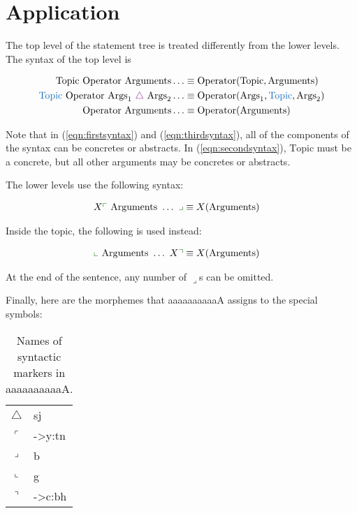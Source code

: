 \documentclass{book}
\newcommand{\lname}{aaaaaaaaaaA}
\begin{document}
\section{Application}

The top level of the statement tree is treated differently from the lower levels. The syntax of the top level is

\begin{align}
  \text{Topic } \text{Operator } \text{Arguments} \ldots &\equiv \text{Operator}(\text{Topic}, \text{Arguments})
  \label{eqn:firstsyntax} \\
  \hliii{\text{Topic }} \text{Operator } \text{Args}_1 \ \hli{\triangle}\  \text{Args}_2 \ldots
    &\equiv \text{Operator}(\text{Args}_1, \hliii{\text{Topic}}, \text{Args}_2)
  \label{eqn:secondsyntax} \\
  \text{Operator } \text{Arguments} \ldots &\equiv \text{Operator}(\text{Arguments})
  \label{eqn:thirdsyntax}
\end{align}

Note that in (\ref{eqn:firstsyntax}) and (\ref{eqn:thirdsyntax}), all of the components of the syntax can be concretes or abstracts. In (\ref{eqn:secondsyntax}), $\text{Topic}$ must be a concrete, but all other arguments may be concretes or abstracts.

The lower levels use the following syntax:

\begin{align}
  X\hlii{\ulcorner}\  \text{Arguments } \ldots\  \hlii{\lrcorner} &\equiv X(\text{Arguments})
\end{align}

Inside the topic, the following is used instead:

\begin{align}
  \hlii{\llcorner}\  \text{Arguments } \ldots\  X\hlii{\urcorner} &\equiv X(\text{Arguments})
\end{align}

At the end of the sentence, any number of $\lrcorner$s can be omitted.

Finally, here are the morphemes that \lname{} assigns to the special symbols:

\begin{table}[h]
  \caption{Names of syntactic markers in \lname.}
  \centering
  \begin{tabular}{l>{\kardinal}l}
    $\triangle$ & sj \\
    $\ulcorner$ & ->y:tn \\
    $\lrcorner$ & b \\
    $\llcorner$ & g \\
    $\urcorner$ & ->c:bh \\
  \end{tabular}
\end{table}
\end{document}
